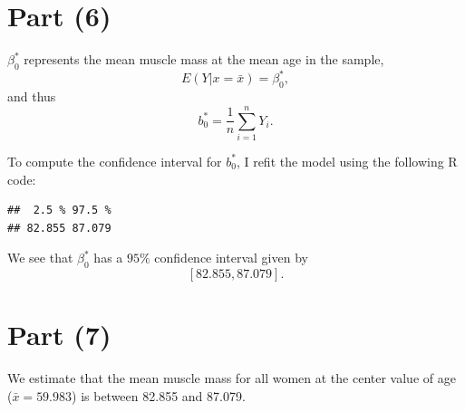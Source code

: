 \documentclass[
]{article}
\newenvironment{Shaded}{\begin{snugshade}}{\end{snugshade}}
\newcommand{\AttributeTok}[1]{\textcolor[rgb]{0.13,0.29,0.53}{#1}}
\newcommand{\DecValTok}[1]{\textcolor[rgb]{0.00,0.00,0.81}{#1}}
\newcommand{\FunctionTok}[1]{\textcolor[rgb]{0.13,0.29,0.53}{\textbf{#1}}}
\newcommand{\NormalTok}[1]{#1}
\newcommand{\OtherTok}[1]{\textcolor[rgb]{0.56,0.35,0.01}{#1}}
\newcommand{\SpecialCharTok}[1]{\textcolor[rgb]{0.81,0.36,0.00}{\textbf{#1}}}
\begin{document}
\hypertarget{part-6}{%
\section{Part (6)}\label{part-6}}


\(\beta_0^*\) represents the mean muscle mass at the mean age in the
sample, \[
  E(Y|x=\bar{x}) = \beta_0^*,
\] and thus \[
  b_0^* = \frac{1}{n} \sum_{i=1}^{n} Y_i.
\]

To compute the confidence interval for \(b_0^*\), I refit the model
using the following R code:

\begin{Shaded}
\end{Shaded}

\begin{verbatim}
##  2.5 % 97.5 % 
## 82.855 87.079
\end{verbatim}

We see that \(\beta_0^*\) has a \(95\%\) confidence interval given by \[
  [82.855,87.079].
\]

\hypertarget{part-7}{%
\section{Part (7)}\label{part-7}}


We estimate that the mean muscle mass for all women at the center value
of age (\(\bar{x} = 59.983\)) is between 82.855 and 87.079.
\end{document}
